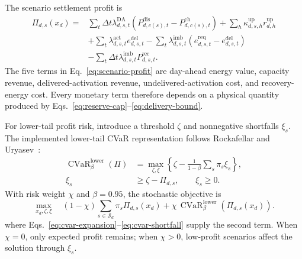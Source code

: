 \documentclass[11pt,a4paper]{article}
\begin{document}
The scenario settlement profit is
\begin{align}
  \Pi_{d,s}(x_d)
  ={}&\sum_t\Delta t\lambda^{\mathrm{DA}}_{d,s,t}
       \left(P^{\mathrm{dis}}_{d,c(s),t}-P^{\mathrm{ch}}_{d,c(s),t}\right)
     +\sum_h\kappa^{\mathrm{up}}_{d,s,h}r^{\mathrm{up}}_{d,h}
  \nonumber\\
   &+\sum_t\lambda^{\mathrm{act}}_{d,s,t}e^{\mathrm{del}}_{d,s,t}
     -\sum_t\lambda^{\mathrm{imb}}_{d,s,t}
       \left(e^{\mathrm{req}}_{d,s,t}-e^{\mathrm{del}}_{d,s,t}\right)
  \nonumber\\
   &-\sum_t\Delta t\lambda^{\mathrm{imb}}_{d,s,t}
       P^{\mathrm{rec}}_{d,s,t}.
  \label{eq:scenario-profit}
\end{align}
The five terms in Eq.~\eqref{eq:scenario-profit} are day-ahead energy value,
capacity revenue, delivered-activation revenue, undelivered-activation cost,
and recovery-energy cost.  Every monetary term therefore depends on a physical
quantity produced by Eqs.~\eqref{eq:reserve-cap}--\eqref{eq:delivery-bound}.

For lower-tail profit risk, introduce a threshold $\zeta$ and nonnegative
shortfalls $\xi_s$.  The implemented lower-tail CVaR representation follows
Rockafellar and Uryasev~\cite{rockafellar2000}:
\begin{align}
  \operatorname{CVaR}^{\mathrm{lower}}_{\beta}(\Pi)
  &=\max_{\zeta,\xi}
  \left\{\zeta-\frac{1}{1-\beta}\sum_s\pi_s\xi_s\right\},
  \label{eq:cvar-expansion}\\
  \xi_s&\geq\zeta-\Pi_{d,s},
  \qquad \xi_s\geq0.
  \label{eq:cvar-shortfall}
\end{align}
With risk weight $\chi$ and $\beta=0.95$, the stochastic objective is
\begin{equation}
  \max_{x_d,\zeta,\xi}\quad
  (1-\chi)\sum_{s\in\mathcal{S}_d}\pi_s\Pi_{d,s}(x_d)
  +\chi\,\operatorname{CVaR}_{\beta}^{\mathrm{lower}}
       \!\left(\Pi_{d,s}(x_d)\right).
  \label{eq:risk-objective}
\end{equation}
where Eqs.~\eqref{eq:cvar-expansion}--\eqref{eq:cvar-shortfall} supply the
second term.  When $\chi=0$,
only expected profit remains; when $\chi>0$, low-profit scenarios affect the
solution through $\xi_s$.
\end{document}
